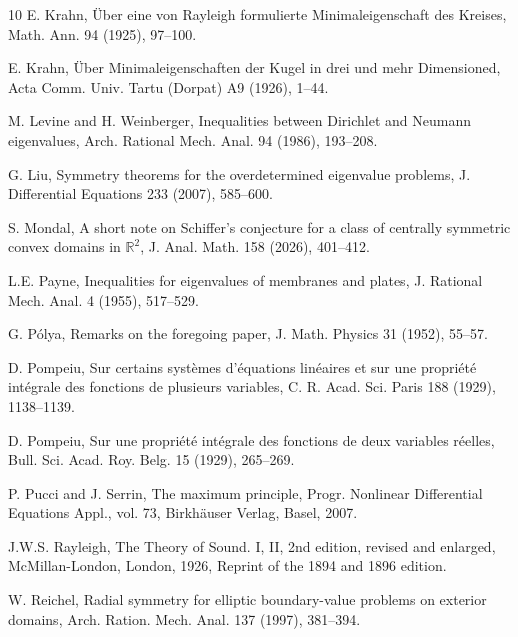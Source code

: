 \documentclass[12pt]{article}
\numberwithin{equation}{section}
\numberwithin{equation}{section}
\begin{document}
\begin{thebibliography}{10}
 E. Krahn, \"{U}ber eine von Rayleigh formulierte Minimaleigenschaft des Kreises, Math. Ann. 94 (1925), 97--100.

 E. Krahn, \"{U}ber Minimaleigenschaften der Kugel in drei und mehr Dimensioned, Acta Comm. Univ. Tartu (Dorpat) A9 (1926), 1--44.


 M. Levine and H. Weinberger, Inequalities between Dirichlet and Neumann eigenvalues, Arch. Rational Mech. Anal. 94 (1986), 193--208.

 G. Liu, Symmetry theorems for the overdetermined eigenvalue problems, J. Differential Equations 233 (2007), 585--600.

 S. Mondal, A short note on Schiffer's conjecture for a class of centrally
symmetric convex domains in $\mathbb R^2$, J. Anal. Math. 158 (2026), 401--412.


 L.E. Payne, Inequalities for eigenvalues of membranes and plates, J. Rational Mech. Anal. 4 (1955), 517--529.

 G. P\'{o}lya, Remarks on the foregoing paper, J. Math. Physics 31 (1952), 55--57.

 D. Pompeiu, Sur certains syst\`{e}mes d'\'{e}quations lin\'{e}aires et sur une propri\'{e}t\'{e} int\'{e}grale des fonctions de plusieurs
variables, C. R. Acad. Sci. Paris 188 (1929), 1138--1139.

 D. Pompeiu, Sur une propri\'{e}t\'{e} int\'{e}grale des fonctions de deux variables r\'{e}elles, Bull. Sci. Acad. Roy. Belg. 15 (1929), 265--269.

 P. Pucci and J. Serrin, The maximum principle, Progr. Nonlinear Differential Equations Appl., vol. 73, Birkh\"{a}user
Verlag, Basel, 2007.

 J.W.S. Rayleigh, The Theory of Sound. I, II, 2nd edition, revised and enlarged, McMillan-London, London, 1926, Reprint of the 1894 and 1896 edition.

 W. Reichel, Radial symmetry for elliptic boundary-value problems on exterior domains, Arch. Ration. Mech.
Anal. 137 (1997), 381--394.


\end{thebibliography}
\end{document}
